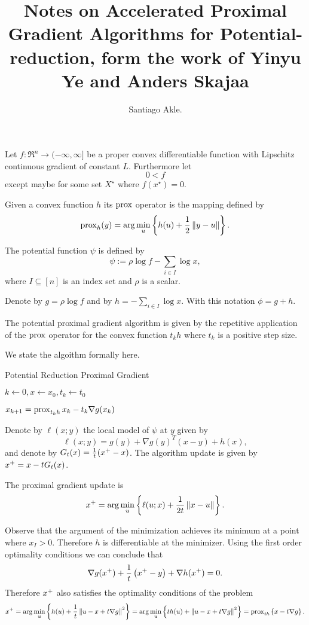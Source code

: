 \documentclass[smallextended]{article}       %
\title{Notes on Accelerated Proximal Gradient Algorithms for Potential-reduction, form the
work of Yinyu Ye and Anders Skajaa}
\author{
   Santiago Akle.
}
\begin{document}
\maketitle

Let $f:\Re^n\to(-\infty,\infty]$ be a proper convex differentiable function
with Lipschitz continuous gradient of constant $L$. Furthermore let
\[0 < f\] except maybe for some set $X^{\star}$ where $f(x^\star) = 0$.

Given a convex function $h$ its $\operatorname{prox}$ operator is the mapping defined by
\[
\operatorname{prox}_{h}(y) = \arg \min_u\left\{h(u) + \frac{1}{2}\left\| y-u \right\|\right\}.
\]

The potential function $\psi$ is defined by
\[
\psi := \rho \log{f} - \sum_{i\in I}\log{x},
\]
where $I\subseteq [n]$ is an index set and $\rho$ is a scalar.

Denote by
$g = \rho \log{f}$ and by $h = -\sum_{i\in I} \log{x}$. 
With this notation $\phi = g+h$.

The potential proximal gradient algorithm is given by the repetitive application
of the $\operatorname{prox}$ operator for the convex function $t_kh$ where $t_k$ is a
positive step size.

We state the algoithm formally here.

\begin{algorithm}{Potential Reduction Proximal Gradient}
  \caption{Proximal Gradient}
  \begin{algorithmic}
  \STATE $k \gets 0, x \gets x_0, t_k \gets t_0$

    \STATE $x_{k+1} = \operatorname{prox}_{t_kh}{x_k - t_k \nabla g(x_k)}$
  \ENDWHILE
  \end{algorithmic}
  \label{alg:ppg}
\end{algorithm}


Denote by $\ell(x;y)$ the local model of $\psi$ at $y$ given by
\[
\ell(x;y) = g(y) + \nabla g(y)^T(x-y) +  h(x),
\]
and denote by $G_t(x) = \frac{1}{t}(x^+ - x)$. 
The algorithm update is given by $x^+ = x-tG_t(x)$.

\begin{clm}
The proximal gradient update is 
\[
    x^+ = \arg \min_u\left\{ \ell(u;x) + \frac{1}{2t}\left\| x-u \right\| \right\}.
\] 
\end{clm}

\begin{prf}
  Observe that the argument of the minimization achieves its minimum at a 
  point where $x_I>0$. Therefore $h$ is differentiable at the minimizer.
  Using the first order optimality conditions we can conclude that
  \[
  \nabla g(x^+) + \frac{1}{t}\left( x^+ - y \right) + \nabla h(x^+)= 0.
  \]
  Therefore $x^+$ also satisfies the optimality conditions of the problem 
  \[
  x^+ = \arg \min_u \left\{ h(u) + \frac{1}{t}\left\| u - x + t\nabla g \right\|^2 \right\} 
      = \arg \min_u\left\{ th(u) + \left\| u - x + t\nabla g \right\|^2 \right\} 
      = \operatorname{prox}_{th}\left\{ x - t\nabla g \right\}.
  \] 
\end{prf}
\end{document}
